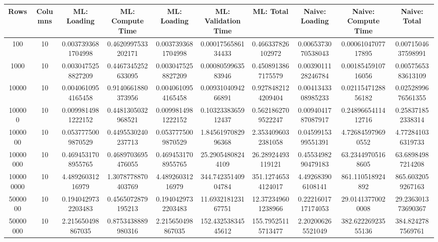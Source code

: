 \begin{table}[htb]
    \centering
    \begin{tabular}{@{}cccccccccc@{}}
        \toprule
        Rows & Columns & ML: Loading & ML: Compute Time & ML: Loading & ML: Validation Time & ML: Total & Naive: Loading & Naive: Compute Time & Naive: Total \\
        \midrule
        100 & 10 & 0.0037393681704998 & 0.4620997533202171 & 0.0037393681704998 & 0.0001756586134433 & 0.466337826102972 & 0.0065373070538043 & 0.0006104707717895 & 0.0071504637598991 \\
        1000 & 10 & 0.0030475258827209 & 0.4467345252633095 & 0.0030475258827209 & 0.0008059963583946 & 0.4508913867175579 & 0.0039011128246784 & 0.0018545910716056 & 0.0057565383613109 \\
        10000 & 10 & 0.0040610954165458 & 0.9140661880373956 & 0.0040610954165458 & 0.0093104094266891 & 0.9278482124209404 & 0.0041343308985233 & 0.0211547128856182 & 0.0252899676561355 \\
        100000 & 10 & 0.0099814981222152 & 0.4481305032968521 & 0.0099814981222152 & 0.1032338365912437 & 0.5621862709522247 & 0.0094041787087917 & 0.2489665411412716 & 0.258371852338314 \\
        1000000 & 10 & 0.0537775009870529 & 0.4495530240237713 & 0.0537775009870529 & 1.8456197082996368 & 2.3534096032381058 & 0.0459915399551391 & 4.726845979690552 & 4.772841036319733 \\
        10000000 & 10 & 0.4694531708955765 & 0.4689703695476055 & 0.4694531708955765 & 25.29054808244109 & 26.28924493119121 & 0.4553498290479183 & 63.23449705168605 & 63.68984987214208 \\
        100000000 & 10 & 4.48926031216979 & 1.3078778870403769 & 4.48926031216979 & 344.74235140904784 & 351.12746534124017 & 4.492683906108141 & 861.110518924892 & 865.6032059267163 \\
        5000000 & 10 & 0.1940429732203483 & 0.4565072879195213 & 0.1940429732203483 & 11.693218123167751 & 12.372349601238966 & 0.2221601717174053 & 29.01413770020008 & 29.236301373690367 \\
        50000000 & 10 & 2.215650498867035 & 0.8753438889980316 & 2.215650498867035 & 152.43253834545612 & 155.79525115713477 & 2.202006265521049 & 382.62226923555136 & 384.8242787569761 \\
        \bottomrule
    \end{tabular}
\end{table}